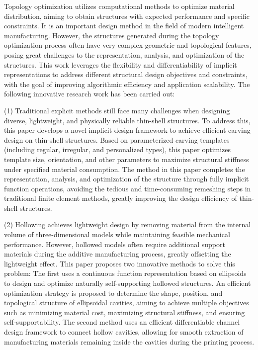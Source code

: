 \begin{abstract*}
Topology optimization utilizes computational methods to optimize material distribution, aiming to obtain structures with expected performance and specific constraints. It is an important design method in the field of modern intelligent manufacturing. However, the structures generated during the topology optimization process often have very complex geometric and topological features, posing great challenges to the representation, analysis, and optimization of the structures. This work leverages the flexibility and differentiability of implicit representations to address different structural design objectives and constraints, with the goal of improving algorithmic efficiency and application scalability. The following innovative research work has been carried out:

(1) Traditional explicit methods still face many challenges when designing diverse, lightweight, and physically reliable thin-shell structures. To address this, this paper develops a novel implicit design framework to achieve efficient carving design on thin-shell structures. Based on parameterized carving templates (including regular, irregular, and personalized types), this paper optimizes template size, orientation, and other parameters to maximize structural stiffness under specified material consumption. The method in this paper completes the representation, analysis, and optimization of the structure through fully implicit function operations, avoiding the tedious and time-consuming remeshing steps in traditional finite element methods, greatly improving the design efficiency of thin-shell structures.

(2) Hollowing achieves lightweight design by removing material from the internal volume of three-dimensional models while maintaining feasible mechanical performance. However, hollowed models often require additional support materials during the additive manufacturing process, greatly offsetting the lightweight effect. This paper proposes two innovative methods to solve this problem: The first uses a continuous function representation based on ellipsoids to design and optimize naturally self-supporting hollowed structures. An efficient optimization strategy is proposed to determine the shape, position, and topological structure of ellipsoidal cavities, aiming to achieve multiple objectives such as minimizing material cost, maximizing structural stiffness, and ensuring self-supportability. The second method uses an efficient differentiable channel design framework to connect hollow cavities, allowing for smooth extraction of manufacturing materials remaining inside the cavities during the printing process.


\end{abstract*}
